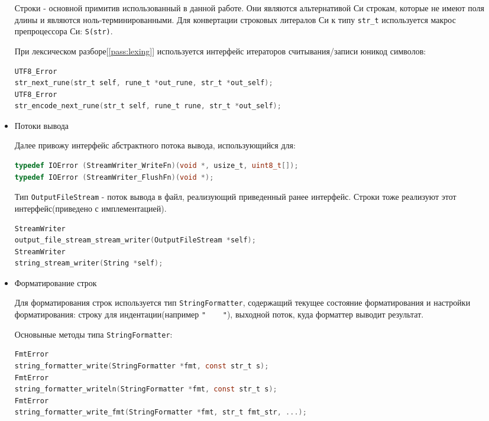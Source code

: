 \begin{itemize}
Строки - основной примитив использованный в данной работе. Они являются альтернативой Си строкам, которые не имеют поля длины и являются ноль-терминированными.
Для конвертации строковых литералов Си к типу \verb|str_t| используется макрос препроцессора Си: \verb|S(str)|.

При лексическом разборе[\ref{pass:lexing}] используется интерфейс итераторов считывания/записи юникод символов:
\begin{lstlisting}[language=c, caption={Функции итерации считывания/записи строк}, label={primitives:str-iter-api}]
UTF8_Error
str_next_rune(str_t self, rune_t *out_rune, str_t *out_self);
UTF8_Error
str_encode_next_rune(str_t self, rune_t rune, str_t *out_self);
\end{lstlisting}


\item Потоки вывода

Далее привожу интерфейс абстрактного потока вывода, использующийся для:

\begin{lstlisting}[language=c, caption={Интерфейс абстрактного потока вывода}, label={primitives:io-api}]
typedef IOError (StreamWriter_WriteFn)(void *, usize_t, uint8_t[]);
typedef IOError (StreamWriter_FlushFn)(void *);
\end{lstlisting}


Тип \verb|OutputFileStream| - поток вывода в файл, реализующий приведенный ранее интерфейс.
Строки тоже реализуют этот интерфейс(приведено с имплементацией).

\begin{lstlisting}[language=c, caption={Реализация интерфейса потока вывода другими типами}]
StreamWriter
output_file_stream_stream_writer(OutputFileStream *self);
StreamWriter
string_stream_writer(String *self);
\end{lstlisting}

\item\label{primitives:formatter} Форматирование строк

Для форматирования строк используется тип \verb|StringFormatter|, содержащий текущее состояние форматирования и настройки форматирования:
строку для индентации(например \verb|"    "|), выходной поток, куда форматтер выводит результат.

Основыные методы типа \verb|StringFormatter|:
\begin{lstlisting}[language=c, caption={Интерфейс объекта форматирования строк}, label={primitives:string-formatter-api}]
FmtError
string_formatter_write(StringFormatter *fmt, const str_t s);
FmtError
string_formatter_writeln(StringFormatter *fmt, const str_t s);
FmtError
string_formatter_write_fmt(StringFormatter *fmt, str_t fmt_str, ...);
\end{lstlisting}


\end{itemize}
